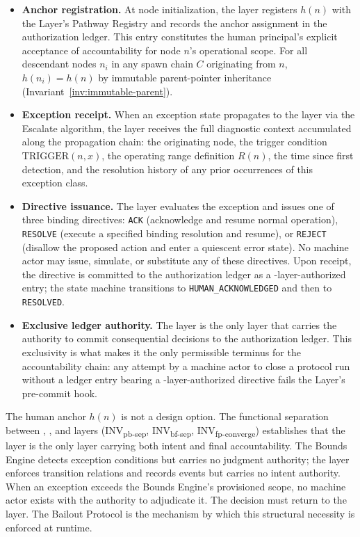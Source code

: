\begin{itemize}\itemsep=0pt
\item[(\textit{i})] \textbf{Anchor registration.} At node initialization, the \purpose{} layer registers $h(n)$ with the \fact{} Layer's Pathway Registry and records the anchor assignment in the authorization ledger. This entry constitutes the human principal's explicit acceptance of accountability for node $n$'s operational scope. For all descendant nodes $n_i$ in any spawn chain $C$ originating from $n$, $h(n_i) = h(n)$ by immutable parent-pointer inheritance (Invariant~\ref{inv:immutable-parent}).

\item[(\textit{ii})] \textbf{Exception receipt.} When an exception state propagates to the \purpose{} layer via the Escalate algorithm, the \purpose{} layer receives the full diagnostic context accumulated along the propagation chain: the originating node, the trigger condition $\text{TRIGGER}(n, x)$, the operating range definition $R(n)$, the time since first detection, and the resolution history of any prior occurrences of this exception class.

\item[(\textit{iii})] \textbf{Directive issuance.} The \purpose{} layer evaluates the exception and issues one of three binding directives: \texttt{ACK} (acknowledge and resume normal operation), \texttt{RESOLVE} (execute a specified binding resolution and resume), or \texttt{REJECT} (disallow the proposed action and enter a quiescent error state). No machine actor may issue, simulate, or substitute any of these directives. Upon receipt, the directive is committed to the authorization ledger as a \purpose{}-layer-authorized entry; the state machine transitions to \texttt{HUMAN\_ACKNOWLEDGED} and then to \texttt{RESOLVED}.

\item[(\textit{iv})] \textbf{Exclusive ledger authority.} The \purpose{} layer is the only layer that carries the authority to commit consequential decisions to the authorization ledger. This exclusivity is what makes it the only permissible terminus for the accountability chain: any attempt by a machine actor to close a protocol run without a ledger entry bearing a \purpose{}-layer-authorized directive fails the \fact{} Layer's pre-commit hook.
\end{itemize}

The human anchor $h(n)$ is not a design option. The functional separation between \purpose{}, \bounds{}, and \fact{} layers (INV\textsubscript{pb-sep}, INV\textsubscript{bf-sep}, INV\textsubscript{fp-converge}) establishes that the \purpose{} layer is the only layer carrying both intent and final accountability. The Bounds Engine detects exception conditions but carries no judgment authority; the \fact{} layer enforces transition relations and records events but carries no intent authority. When an exception exceeds the Bounds Engine's provisioned scope, no machine actor exists with the authority to adjudicate it. The decision must return to the \purpose{} layer. The Bailout Protocol is the mechanism by which this structural necessity is enforced at runtime.


